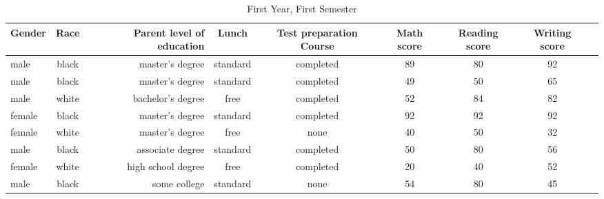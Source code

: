 \documentclass{article}
\begin{document}
	\begin{sidewaystable}[h!]
		\begin{center}
			\caption {First Year, First Semester}
			\label{tab:table1}
			\begin{tabular}{l|c|r|c|c|c|c|c|c|}
				\textbf{Gender} & \textbf{Race} & \textbf{Parent level of education} & \textbf{Lunch} & \textbf{Test preparation Course} & \textbf{Math score} & \textbf{Reading score} & \textbf{Writing score}\\
				\hline
				male & 	black & master's degree & standard & completed & 89 & 80 & 92 \\
					male & 	black & master's degree & standard & completed & 49 & 50 & 65 \\
						male & 	white & bachelor's degree & free & completed & 52 & 84 & 82 \\
							female & 	black & master's degree & standard & completed & 92 & 92 & 92 \\
								female & white & master's degree & free & none & 40 & 50 & 32 \\
									male & 	black & associate degree & standard & completed & 50 & 80 & 56 \\
										female & 	white & high school degree & free & completed & 20 & 40 & 52 \\
											male & 	black & some college & standard & none & 54 & 80 & 45 \\
											
					\end{tabular}
			\end{center}
		\end{sidewaystable}
	
\end{document}
